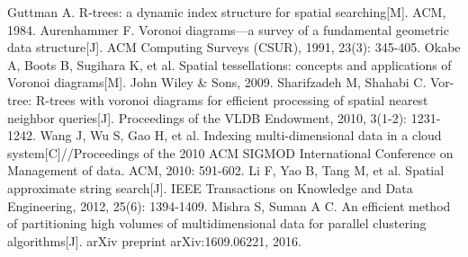 \documentclass{ML}
\begin{document}
\begin{thebibliography}{20}
     Guttman A. R-trees: a dynamic index structure for spatial searching[M]. ACM, 1984.
     Aurenhammer F. Voronoi diagrams—a survey of a fundamental geometric data structure[J]. ACM Computing Surveys (CSUR), 1991, 23(3): 345-405.
     Okabe A, Boots B, Sugihara K, et al. Spatial tessellations: concepts and applications of Voronoi diagrams[M]. John Wiley \& Sons, 2009.
     Sharifzadeh M, Shahabi C. Vor-tree: R-trees with voronoi diagrams for efficient processing of spatial nearest neighbor queries[J]. Proceedings of the VLDB Endowment, 2010, 3(1-2): 1231-1242.
     Wang J, Wu S, Gao H, et al. Indexing multi-dimensional data in a cloud system[C]//Proceedings of the 2010 ACM SIGMOD International Conference on Management of data. ACM, 2010: 591-602.
     Li F, Yao B, Tang M, et al. Spatial approximate string search[J]. IEEE Transactions on Knowledge and Data Engineering, 2012, 25(6): 1394-1409.
     Mishra S, Suman A C. An efficient method of partitioning high volumes of multidimensional data for parallel clustering algorithms[J]. arXiv preprint arXiv:1609.06221, 2016.
\end{thebibliography}
\end{document}
